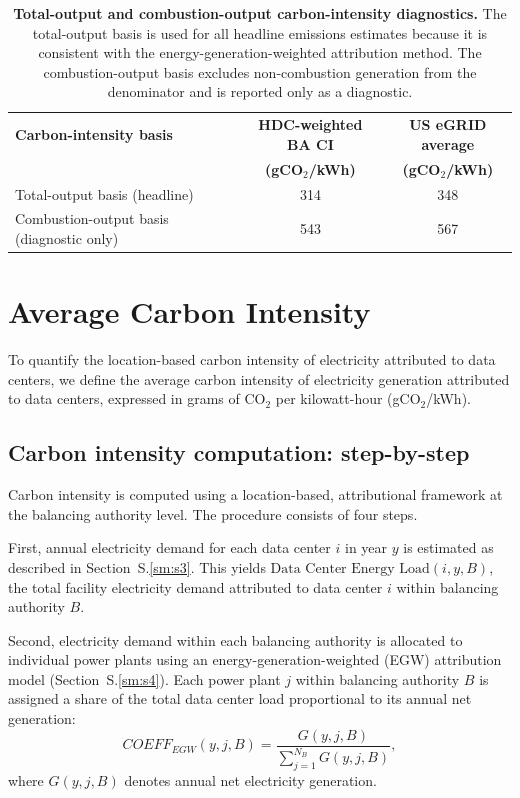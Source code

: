 \documentclass[12pt]{article}
\begin{document}
\begin{table}[H]
\centering
\caption{\textbf{Total-output and combustion-output carbon-intensity diagnostics.} The total-output basis is used for all headline emissions estimates because it is consistent with the energy-generation-weighted attribution method. The combustion-output basis excludes non-combustion generation from the denominator and is reported only as a diagnostic.}
\label{tab:denominator_audit}
\begin{tabular}{lcc}
\toprule
\textbf{Carbon-intensity basis} & \textbf{HDC-weighted BA CI} & \textbf{US eGRID average} \\
 & \textbf{(gCO$_2$/kWh)} & \textbf{(gCO$_2$/kWh)} \\
\midrule
Total-output basis (headline) & 314 & 348 \\
Combustion-output basis (diagnostic only) & 543 & 567 \\
\bottomrule
\end{tabular}
\end{table}


\section{Average Carbon Intensity}\label{sm:s5}

To quantify the location-based carbon intensity of electricity attributed to data centers, we define the
average carbon intensity of electricity generation attributed to data centers,
expressed in grams of CO$_2$ per kilowatt-hour (gCO$_2$/kWh).

\subsection*{Carbon intensity computation: step-by-step}

Carbon intensity is computed using a location-based, attributional framework at the 
balancing authority level. The procedure consists of four steps.

First, annual electricity demand for each data center $i$ in year $y$ is estimated as 
described in Section~S.\ref{sm:s3}. This yields $\text{Data Center Energy Load}(i,y,B)$, 
the total facility electricity demand attributed to data center $i$ within balancing 
authority $B$.

Second, electricity demand within each balancing authority is allocated to individual 
power plants using an energy-generation-weighted (EGW) attribution model 
(Section~S.\ref{sm:s4}). Each power plant $j$ within balancing authority $B$ is assigned 
a share of the total data center load proportional to its annual net generation:
\[
COEFF_{EGW}(y,j,B) = \frac{G(y,j,B)}{\sum_{j=1}^{N_B} G(y,j,B)} ,
\]
where $G(y,j,B)$ denotes annual net electricity generation.
\end{document}
